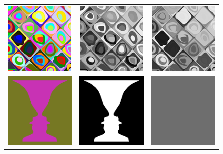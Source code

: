 \begin{figure}[t] 
\begin{center} 
\begin{tabular}{ccc}		
\includegraphics[width=0.25\linewidth]{fig/isoluminance.png} &
\includegraphics[width=0.25\linewidth]{fig/isoluminance-sparse_dr.png} & 
\includegraphics[width=0.25\linewidth]{fig/isoluminance-rgb2gray.png} \\
\includegraphics[width=0.25\linewidth]{fig/rubin_vase.png} & 
\includegraphics[width=0.25\linewidth]{fig/rubin_vase-sparse_dr.png} &
\includegraphics[width=0.25\linewidth]{fig/rubin_vase-rgb2gray.png} \\

\end{tabular}
\end{center}
\end{figure}

